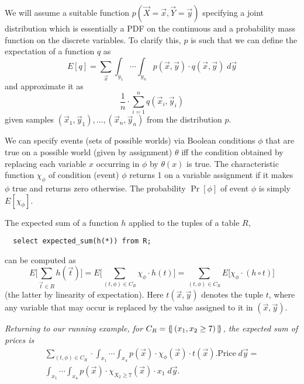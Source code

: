 We    will   assume    a    suitable   function    $p(\vec{X}=\vec{x},
\vec{Y}=\vec{y})$ specifying a joint distribution which is essentially
a  PDF  on the  continuous  and a  probability  mass  function on  the
discrete variables.  To clarify  this, $p$ is such that
we can define the expectation of a function $q$ as
\[
E[q] =
\sum_{\vec{x}} \int_{y_1} \cdots \int_{y_n}
p(\vec{x}, \vec{y}) \cdot q(\vec{x}, \vec{y}) \; d \vec{y}
\]
and approximate it as
\[
\frac{1}{n} \cdot \sum_{i=1}^n q(\vec{x}_i, \vec{y}_i)
\]
given samples $(\vec{x}_1, \vec{y}_1), \dots, (\vec{x}_n, \vec{y}_n)$ from
the distribution $p$.



We can specify events (sets of possible worlds) via Boolean conditions
$\phi$  that  are true  on  a  possible  world (given  by  assignment)
$\theta$  iff the condition  obtained by  replacing each  variable $x$
occurring  in  $\phi$  by  $\theta(x)$ is  true.   The  characteristic
function  $\chi_\phi$  of condition  (event)  $\phi$  returns  1 on  a
variable  assignment  if  it   makes  $\phi$  true  and  returns  zero
otherwise.   The probability  $\Pr[\phi]$  of event  $\phi$ is  simply
$E[\chi_\phi]$.

The expected  sum of a function $h$  applied to the tuples  of a table
$R$,
{\small\begin{verbatim}
  select expected_sum(h(*)) from R;
\end{verbatim}}
can be computed as
\[
E \Big[ \sum_{\vec{t}  \in R}  h(\vec{t}) \Big]  =
E \Big[ \sum_{(t, \phi) \in C_R} \chi_\phi \cdot h(t) \Big] =
\sum_{(t, \phi) \in C_R} E \Big[ \chi_\phi \cdot (h \circ t) \Big]
\]
(the latter by linearity of expectation).
Here $t(\vec{x}, \vec{y})$ denotes
the tuple $t$, where any variable that may occur is replaced by
the value assigned to it in $(\vec{x}, \vec{y})$.


\begin{example}\em
Returning to our running example, for $C_R = \{\!|\, (x_1, x_2 \ge 7) \,|\!\}$, the expected sum of prices is
\begin{multline*}
   \sum_{(t,  \phi) \in  C_R} \cdot  
   \int_{x_1} \cdots
   \int_{x_4}  p(\vec{x})  \cdot  \chi_\phi(\vec{x})
   \cdot t(\vec{x}).\mathrm{Price} \; d \vec{y}
= \\
   \int_{x_1} \cdots
   \int_{x_4}  p(\vec{x})  \cdot  \chi_{X_2 \ge 7}(\vec{x})
   \cdot x_1 \; d \vec{y}.
\end{multline*}
\end{example}


